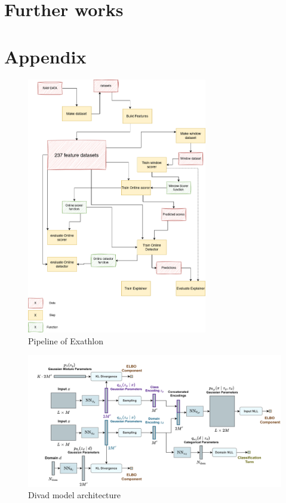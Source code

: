 \documentclass[oneside, a4paper, onecolumn, 11pt]{article}
\begin{document}
\section{Further works}

\newpage



\newpage
\appendix

\section{Appendix}
\label{sec:appendix}


\begin{figure}[h]
    \centering
    \includegraphics[width=0.7\textwidth]{images/pipeline.drawio.png} %
    \caption{Pipeline of Exathlon}
    \label{fig:pipeline}
\end{figure}
\begin{figure}[h]
  \centering
  \includegraphics[width=1\textwidth]{images/divad model.png} %
  \caption{Divad model architecture}
  \label{fig:divad_arch}
\end{figure}
\end{document}
